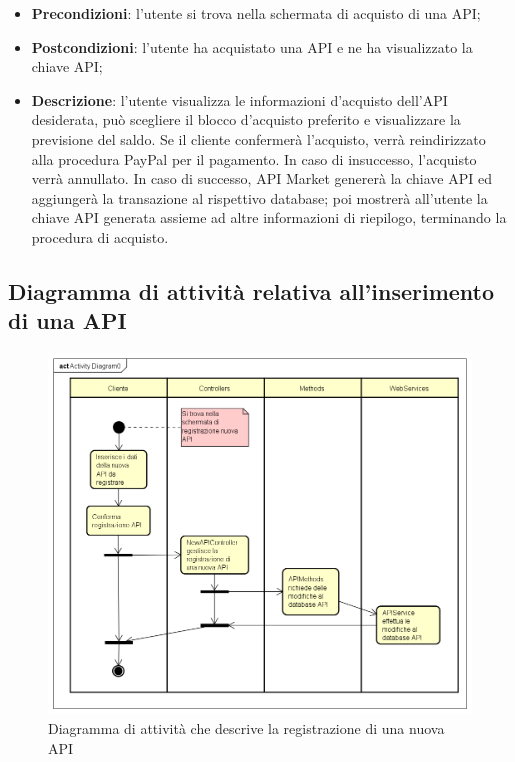 \begin{itemize}
	\item \textbf{Precondizioni}: l'utente si trova nella schermata di acquisto di una API;
	\item \textbf{Postcondizioni}: l'utente ha acquistato una API e ne ha visualizzato la chiave API;
	\item \textbf{Descrizione}: l'utente visualizza le informazioni d'acquisto dell'API desiderata, può scegliere il blocco d'acquisto preferito e visualizzare la previsione del saldo. Se il cliente confermerà l'acquisto, verrà reindirizzato alla procedura PayPal per il pagamento. In caso di insuccesso, l'acquisto verrà annullato. In caso di successo, API Market genererà la chiave API ed aggiungerà la transazione al rispettivo database; poi mostrerà all'utente la chiave API generata assieme ad altre informazioni di riepilogo, terminando la procedura di acquisto.
\end{itemize}

\newpage
\subsection{Diagramma di attività relativa all'inserimento di una API}
\begin{figure}[h]
	\centering
	\includegraphics[width=1.0\linewidth]{IMG/att_Registrazione_API}
	\caption{Diagramma di attività che descrive la registrazione di una nuova API}
	\label{fig:inserimentoapi}
\end{figure}


